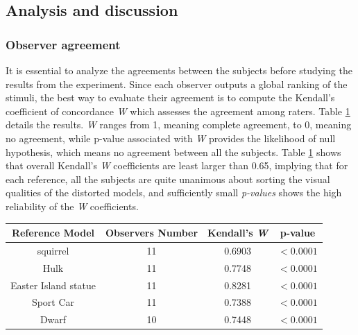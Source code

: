 \subsection{Analysis and discussion}
\subsubsection{Observer agreement}
It is essential to analyze the agreements between the subjects before studying the results from the experiment. Since each observer outputs a global ranking of the stimuli, the best way to evaluate their agreement is to compute the Kendall's coefficient of concordance \textit{W} \cite{Kendall_1940} which assesses the agreement among raters. Table \ref{tab-W} details the results. \textit{W} ranges from 1, meaning complete agreement, to 0, meaning no agreement, while p-value associated with \textit{W} provides the likelihood of null hypothesis, which means no agreement between all the subjects. Table \ref{tab-W} shows that overall Kendall’s \textit{W} coefficients are least larger than 0.65, implying that for each reference, all the subjects are quite unanimous about sorting the visual qualities of the distorted models, and sufficiently small \textit{p-values} shows the high reliability of the \textit{W} coefficients.\\
\begin{table}

    \begin{tabular}{c c  c c}
        \textbf{Reference Model} & \textbf{Observers Number} & \textbf{Kendall's \textit{W}} & \textbf{p-value} \\ \hline
        squirrel & 11 & 0.6903 & $<0.0001$ \\ 
        Hulk & 11 & 0.7748 & $<0.0001$ \\ 
        Easter Island statue & 11 & 0.8281 & $<0.0001$ \\ 
        Sport Car & 11 & 0.7388 & $<0.0001$ \\ 
        Dwarf & 10 & 0.7448 & $<0.0001$ \\ \hline
    \end{tabular}%
		
   \label{tab-W}
\end{table}



